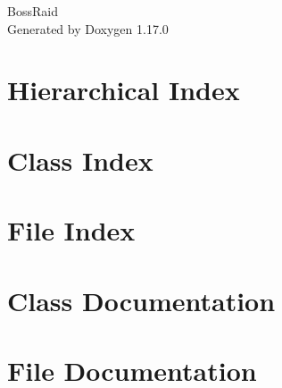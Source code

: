 \documentclass[twoside]{book}
\newcommand{\+}{\discretionary{\mbox{\scriptsize$\hookleftarrow$}}{}{}}
\newcommand{\clearemptydoublepage}{%
    \newpage{\pagestyle{empty}\cleardoublepage}%
  }
\begin{document}
  \raggedbottom
    \hypersetup{pageanchor=false,
                bookmarksnumbered=true,
                pdfencoding=unicode
               }
  \begin{titlepage}
  \vspace*{7cm}
  \begin{center}%
  {\Large Boss\+Raid}\\
  \vspace*{1cm}
  {\large Generated by Doxygen 1.17.0}\\
  \end{center}
  \end{titlepage}
  \clearemptydoublepage
  \tableofcontents
  \clearemptydoublepage
  \hypersetup{pageanchor=true}
\chapter{Hierarchical Index}

\chapter{Class Index}

\chapter{File Index}

\chapter{Class Documentation}

















\chapter{File Documentation}












  \backmatter
  \newpage
  \clearemptydoublepage
  \printindex
\end{document}
